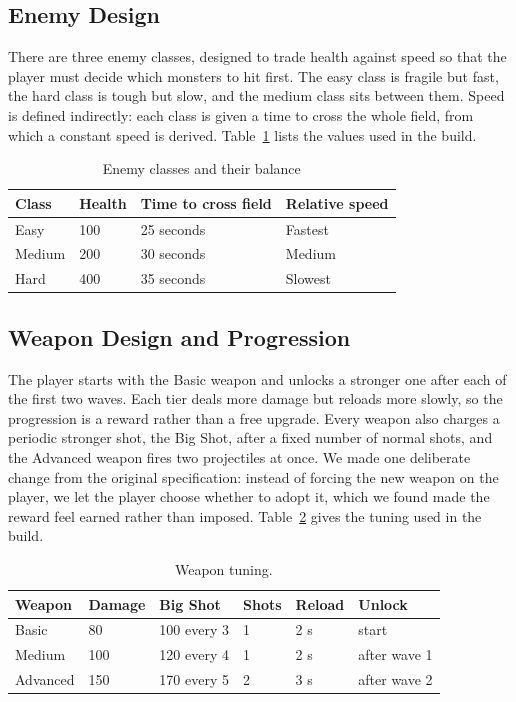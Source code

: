 \documentclass[12pt,a4paper]{report}
\begin{document}
\subsection{Enemy Design}

There are three enemy classes, designed to trade health against speed so that
the player must decide which monsters to hit first. The easy class is fragile
but fast, the hard class is tough but slow, and the medium class sits between
them. Speed is defined indirectly: each class is given a time to cross the whole
field, from which a constant speed is derived. Table~\ref{tab:enemies} lists the values used in the build. 

\begin{table}[h]
\centering
\caption{Enemy classes and their balance}
\label{tab:enemies}
\begin{tabular}{|p{2.6cm}|p{2.4cm}|p{3.2cm}|p{3.0cm}|}
\hline
Class & Health & Time to cross field & Relative speed \\
\hline
Easy   & 100 & 25 seconds & Fastest \\
\hline
Medium & 200 & 30 seconds & Medium \\
\hline
Hard   & 400 & 35 seconds & Slowest \\
\hline
\end{tabular}
\end{table}

\subsection{Weapon Design and Progression}

The player starts with the Basic weapon and unlocks a stronger one after each of
the first two waves. Each tier deals more damage but reloads more slowly, so the
progression is a reward rather than a free upgrade. Every weapon also charges a
periodic stronger shot, the Big Shot, after a fixed number of normal shots, and
the Advanced weapon fires two projectiles at once. We made one deliberate change
from the original specification: instead of forcing the new weapon on the
player, we let the player choose whether to adopt it, which we found made the
reward feel earned rather than imposed. Table~\ref{tab:weapons} gives the tuning
used in the build.

\begin{table}[h]
\centering
\caption{Weapon tuning.}
\label{tab:weapons}
\begin{tabular}{|p{2.2cm}|p{1.6cm}|p{2.4cm}|p{1.8cm}|p{1.6cm}|p{2.0cm}|}
\hline
Weapon & Damage & Big Shot & Shots & Reload & Unlock \\
\hline
Basic    & 80  & 100 every 3 & 1 & 2 s & start \\
\hline
Medium   & 100 & 120 every 4 & 1 & 2 s & after wave 1 \\
\hline
Advanced & 150 & 170 every 5 & 2 & 3 s & after wave 2 \\
\hline
\end{tabular}
\end{table}
\end{document}
